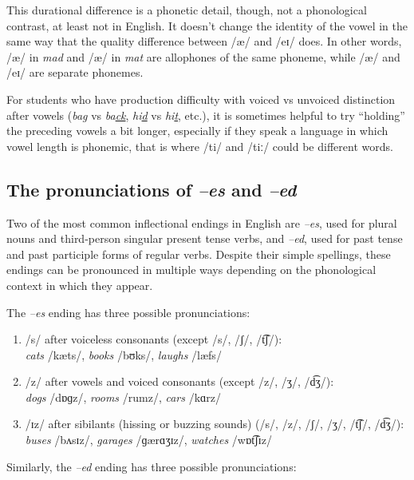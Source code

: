 This durational difference is a phonetic detail, though, not a phonological contrast, at least not in English. It doesn't change the identity of the vowel in the same way that the quality difference between /æ/ and /eɪ/ does. In other words, /æ/ in \textit{mad} and /æ/ in \textit{mat} are allophones of the same phoneme, while /æ/ and /eɪ/ are separate phonemes.

For students who have production difficulty with voiced vs unvoiced distinction after vowels (\textit{ba\uline{g}} vs \textit{ba\uline{ck}}, \textit{hi\uline{d}} vs \textit{hi\uline{t}}, etc.), it is sometimes helpful to try ``holding'' the preceding vowels a bit longer, especially if they speak a language in which vowel length is phonemic, that is where /ti/ and /tiː/ could be different words.

\subsection{The pronunciations of \textit{--\op e\cp s} and \textit{--ed}}

Two of the most common inflectional endings in English are \textit{--\op e\cp s}, used for plural nouns and third-person singular present tense verbs, and \textit{--ed}, used for past tense and past participle forms of regular verbs. Despite their simple spellings, these endings can be pronounced in multiple ways depending on the phonological context in which they appear.

The \textit{--\op e\cp s} ending has three possible pronunciations:

\begin{enumerate}[noitemsep]
    \item /s/ after voiceless consonants (except /s/, /ʃ/, /t͡ʃ/): \\\textit{cats} /kæts/, \textit{books} /bʊks/, \textit{laughs} /læfs/
    \item /z/ after vowels and voiced consonants (except /z/, /ʒ/, /d͡ʒ/): \\\textit{dogs} /dɒɡz/, \textit{rooms} /rumz/, \textit{cars} /kɑrz/
    \item /ɪz/ after sibilants (hissing or buzzing sounds) (/s/, /z/, /ʃ/, /ʒ/, /t͡ʃ/, /d͡ʒ/): \textit{buses} /bʌsɪz/, \textit{garages} /ɡærɑʒɪz/, \textit{watches} /wɒt͡ʃɪz/
\end{enumerate}

Similarly, the \textit{--ed} ending has three possible pronunciations:

